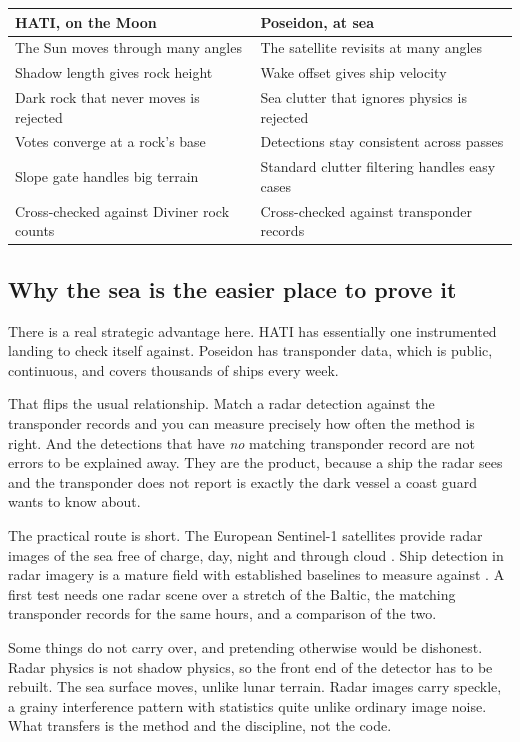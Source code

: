 \documentclass[11pt]{article}
\begin{document}
\begin{center}
\small
\begin{tabular}{ll}
\toprule
HATI, on the Moon & Poseidon, at sea \\
\midrule
The Sun moves through many angles & The satellite revisits at many angles \\
Shadow length gives rock height & Wake offset gives ship velocity \\
Dark rock that never moves is rejected & Sea clutter that ignores physics is rejected \\
Votes converge at a rock's base & Detections stay consistent across passes \\
Slope gate handles big terrain & Standard clutter filtering handles easy cases \\
Cross-checked against Diviner rock counts & Cross-checked against transponder records \\
\bottomrule
\end{tabular}
\end{center}

\subsection{Why the sea is the easier place to prove it}

There is a real strategic advantage here. HATI has essentially one instrumented
landing to check itself against. Poseidon has transponder data, which is public,
continuous, and covers thousands of ships every week.

That flips the usual relationship. Match a radar detection against the transponder
records and you can measure precisely how often the method is right. And the
detections that have \emph{no} matching transponder record are not errors to be
explained away. They are the product, because a ship the radar sees and the
transponder does not report is exactly the dark vessel a coast guard wants to know
about.

The practical route is short. The European Sentinel-1 satellites provide radar images
of the sea free of charge, day, night and through cloud \autocite{torres2012}. Ship
detection in radar imagery is a mature field with established baselines to measure
against \autocite{crisp2004}. A first test needs one radar scene over a stretch of the
Baltic, the matching transponder records for the same hours, and a comparison of the
two.

\begin{limitbox}
Some things do not carry over, and pretending otherwise would be dishonest. Radar
physics is not shadow physics, so the front end of the detector has to be rebuilt. The
sea surface moves, unlike lunar terrain. Radar images carry speckle, a grainy
interference pattern with statistics quite unlike ordinary image noise. What transfers
is the method and the discipline, not the code.
\end{limitbox}
\end{document}
